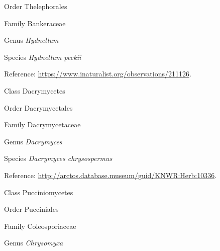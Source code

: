 \documentclass[9pt, article]{memoir}
\begin{document}
\begin{multicols}{2}
\vspace{6pt}\noindent\hspace{18pt}Order Thelephorales


\vspace{6pt}\noindent\hspace{24pt}Family Bankeraceae


\vspace{6pt}\noindent\hspace{30pt}Genus \textit{Hydnellum}


\vspace{6pt}\noindent\hspace{36pt}Species \textit{Hydnellum peckii}


\vspace{6pt}Reference: 
\url{https://www.inaturalist.org/observations/211126}.

\vspace{6pt}\noindent\hspace{12pt}Class Dacrymycetes


\vspace{6pt}\noindent\hspace{18pt}Order Dacrymycetales


\vspace{6pt}\noindent\hspace{24pt}Family Dacrymycetaceae


\vspace{6pt}\noindent\hspace{30pt}Genus \textit{Dacrymyces}


\vspace{6pt}\noindent\hspace{36pt}Species \textit{Dacrymyces chrysospermus}


\vspace{6pt}Reference: 
\url{http://arctos.database.museum/guid/KNWR:Herb:10336}.

\vspace{6pt}\noindent\hspace{12pt}Class Pucciniomycetes


\vspace{6pt}\noindent\hspace{18pt}Order Pucciniales


\vspace{6pt}\noindent\hspace{24pt}Family Coleosporiaceae


\vspace{6pt}\noindent\hspace{30pt}Genus \textit{Chrysomyxa}



\end{multicols}
\end{document}
